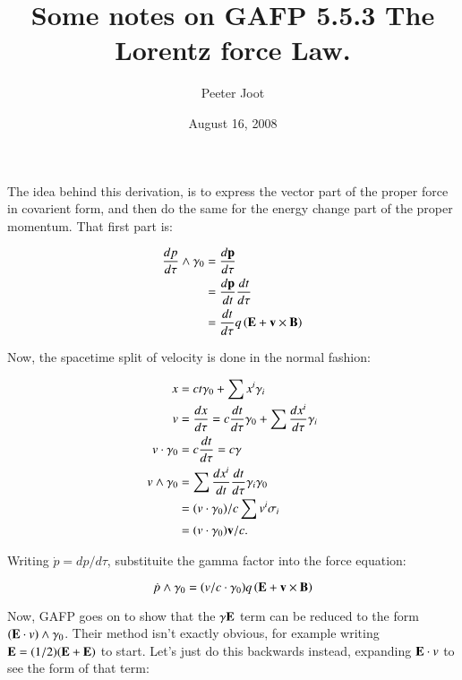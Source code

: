\documentclass{article}
\title{ Some notes on GAFP 5.5.3 The Lorentz force Law.}
\author{Peeter Joot}
\date{August 16, 2008}
\begin{document}
             

\maketitle{}

\section{}

The idea behind this derivation, is to express the vector part of the proper force in covarient form, and then
do the same for the energy change part of the proper momentum.  That first part is:

\begin{align*}
\frac{dp}{d\tau} \wedge \gamma_0 
&= \frac{d \mathbf{p}}{d\tau} \\
&= \frac{d \mathbf{p}}{dt} \frac{dt}{d\tau} \\
&= \frac{dt}{d\tau} q \left( \mathbf{E} + \mathbf{v} \times \mathbf{B} \right)
\end{align*}

Now, the spacetime split of velocity is done in the normal fashion:

\begin{align*}
x &= c t \gamma_0 + \sum x^i \gamma_i \\
v &= \frac{dx}{d\tau} = c \frac{dt}{d\tau} \gamma_0 + \sum \frac{dx^i}{d\tau} \gamma_i \\
v \cdot \gamma_0 &= c \frac{dt}{d\tau} = c \gamma \\
v \wedge \gamma_0
&= \sum \frac{dx^i}{dt} \frac{dt}{d\tau} \gamma_i \gamma_0 \\
&= (v \cdot \gamma_0)/c \sum v^i \sigma_i \\
&= (v \cdot \gamma_0) \mathbf{v}/c.
\end{align*}

Writing $\dot{p} = dp/d\tau$, substituite the gamma factor into the force equation:

\begin{equation*}
\dot{p} \wedge \gamma_0 = ( v/c \cdot \gamma_0 ) q \left( \mathbf{E} + \mathbf{v} \times \mathbf{B} \right)
\end{equation*}

Now, GAFP goes on to show that the $\gamma \mathbf{E}$ term can be reduced to the form $(\mathbf{E} \cdot v) \wedge \gamma_0$.  Their
method isn't exactly obvious, for example writing $\mathbf{E} = (1/2)(\mathbf{E} + \mathbf{E})$ to start.  Let's just do this backwards 
instead, expanding $\mathbf{E} \cdot v$ to see the form of that term:
\end{document}
